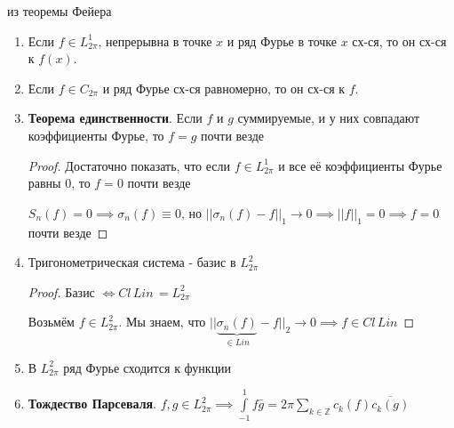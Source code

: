 \begin{consequence}
    из теоремы Фейера
    \begin{enumerate}
        \item {

            Если $f \in L_{2\pi}^1$, непрерывна в точке $x$ и ряд Фурье в точке $x$ сх-ся, то он сх-ся к $f(x)$.
        }
        \item {
            
            Если $f \in C_{2\pi}$ и ряд Фурье сх-ся равномерно, то он сх-ся к $f$.

            
        }
        \item {
            \textbf{Теорема единственности}. Если $f$ и $g$ суммируемые, и у них совпадают коэффициенты Фурье, то $f = g$ почти везде

            \begin{proof}
                Достаточно показать, что если $f \in L_{2\pi}^1$ и все её коэффициенты Фурье равны 0, то $f = 0$ почти везде

                $S_n (f) = 0 \implies \sigma_n (f) \equiv 0$, но $|| \sigma_n (f) - f ||_1 \rightarrow 0 \implies ||f||_1 = 0 \implies f = 0$ почти везде
            \end{proof}
        }
        \item {
            Тригонометрическая система - базис в $L_{2\pi}^2$

            \begin{proof}
                Базис $\Leftrightarrow Cl \, Lin \, = L_{2\pi}^2$

                Возьмём $f \in L_{2\pi}^2$. Мы знаем, что $|| \underbrace{\sigma_n (f)}_{\in Lin} - f ||_2 \rightarrow 0 \implies f \in Cl \, Lin $
            \end{proof}
        }
        \item {
            В $L_{2\pi}^2$ ряд Фурье сходится к функции
        }
        \item {
            \textbf{Тождество Парсеваля}. $f, g \in L_{2\pi}^2 \implies \int\limits_{-1}^1 f \bar{g} = 2\pi \sum\limits_{k \in \mathbb{Z}} c_k (f) \overline{c_k (g)}$ 
        }
    \end{enumerate}
\end{consequence}

